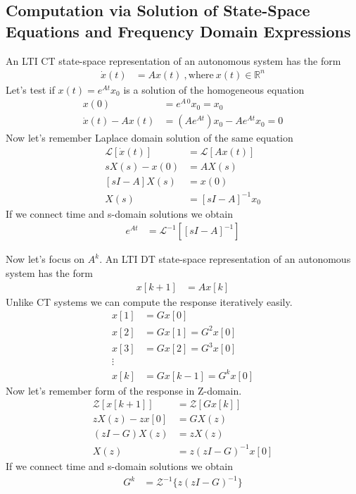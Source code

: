 \documentclass[twoside]{article}
\begin{document}
\subsection{Computation via Solution of State-Space Equations and Frequency Domain Expressions}

An LTI CT state-space representation of an autonomous system has the form
%
\begin{align*}
  \dot{x}(t) &= A x(t) \ , \mathrm{where} \ x(t) \in \mathbb{R}^n 
\end{align*}
%
Let's test if $x(t) = e^{A t} x_0$ is a solution of the homogeneous  equation
%
\begin{align*}
  x(0) &= e^{A \, 0} x_0 = x_0
  \\
  \dot{x}(t) - A x(t) &= \left( A e^{At} \right) x_0 - A e^{At} x_0 = 0
\end{align*}
%
Now let's remember Laplace domain solution of the same equation
%
\begin{align*}
\mathcal{L} \left[ \dot{x}(t) \right] &= \mathcal{L} \left[  A x(t) \right]
\\
s X(s) - x(0) &= A X(s) 
\\
[s I - A]  X(s) &= x(0) 
\\
X(s) &= [s I - A]^{-1} x_0 
\end{align*}
%
If we connect time and s-domain solutions we obtain
%
\begin{align*}
  e^{A t} &= \mathcal{L}^{-1} \left[ [s I - A]^{-1} \right]
\end{align*}

Now let's focus on $A^k$. An LTI DT state-space representation of an autonomous system has the form
%
\begin{align*}
  x[k+1] &= A x[k] 
\end{align*}
%
Unlike CT systems we can compute the response iteratively easily.
%
\begin{align*}
  x[1] &= G x[0] 
  \\
  x[2] &= G x[1] = G^2 x[0] 
  \\
  x[3] &= G x[2] = G^3 x[0] 
  \\
  \vdots
  \\
  x[k] &= G x[k-1] = G^k x[0] 
\end{align*}
%
Now let's remember form of the response in Z-domain.
%
\begin{align*}
\mathcal{Z} \left[ x[k+1] \right] &= \mathcal{Z} \left[ G x[k] \right]
\\
z X(z) - z x[0] &= G X(z)
\\
\left( z I - G \right) X(z) &= z X(z) 
\\
X(z) &= z \left( z I - G \right)^{-1} x[0]
\end{align*}
%
If we connect time and s-domain solutions we obtain
\begin{align*}
G^k &= \mathcal{Z}^{-1} \lbrace z \left( z I - G \right)^{-1} \rbrace
\end{align*}
\end{document}
